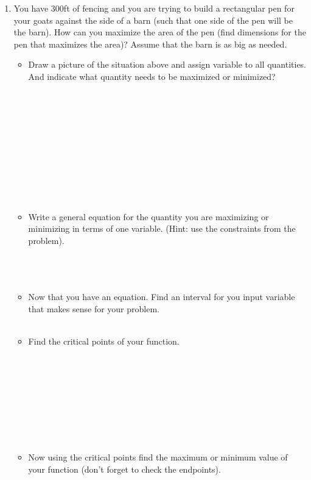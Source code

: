 \documentclass[12pt]{article}
\begin{document}
\begin{enumerate}
    \vspace{4in}

    \newpage
    \item You have $300$ft of fencing and you are trying to build a rectangular pen for your goats against the side of a barn (such that one side of the pen will be the barn). How can you maximize the area of the pen (find dimensions for the pen that maximizes the area)? Assume that the barn is as big as needed.
    \begin{itemize}
        \item Draw a picture of the situation above and assign variable to all quantities. And indicate what quantity needs to be maximized or minimized?\\\\\\\\\\\\\\\\\\\\\\

        \item Write a general equation for the quantity you are maximizing or minimizing in terms of one variable. (Hint: use the constraints from the problem).\\\\\\\\

        \item Now that you have an equation. Find an interval for you input variable that makes sense for your problem. \\\\
        
        \item Find the critical points of your function.\\\\\\\\\\\\\\\\\\

        \item Now using the critical points find the maximum or minimum value of your function (don't forget to check the endpoints).\\\\\\\\\\


\end{itemize}
\end{enumerate}
\end{document}
